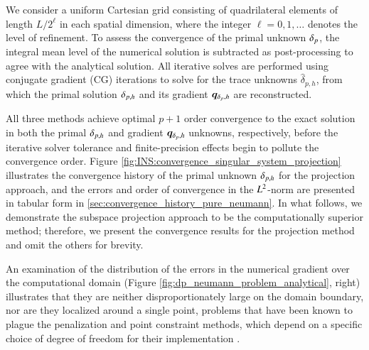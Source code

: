 We consider a uniform Cartesian grid consisting of quadrilateral elements of length $L/2^{\ell}$ in each spatial dimension, where the integer $\ell = 0, 1, \ldots$ denotes the level of refinement.
To assess the convergence of the primal unknown $\delta_{p}$, the integral mean level of the numerical solution is subtracted as post-processing to agree with the analytical solution.
All iterative solves are performed using conjugate gradient (CG) iterations to solve for the trace unknowns $\hat{\delta}_{p,h}$, from which the primal solution $\delta_{p,h}$ and its gradient $\bm{q}_{\delta_{p},h}$ are reconstructed.

All three methods achieve optimal $p+1$ order convergence to the exact solution in both the primal $\delta_{p,h}$ and gradient $\bm{q}_{\delta_{p},h}$ unknowns, respectively, before the iterative solver tolerance and finite-precision effects begin to pollute the convergence order. 
Figure \ref{fig:INS:convergence_singular_system_projection} illustrates the convergence history of the primal unknown $\delta_{p,h}$ for the projection approach, and the errors and order of convergence in the $L^2$-norm are presented in tabular form in \ref{sec:convergence_history_pure_neumann}.
In what follows, we demonstrate the subspace projection approach to be the computationally superior method; therefore, we present the convergence results for the projection method and omit the others for brevity. 

An examination of the distribution of the errors in the numerical gradient over the computational domain (Figure \ref{fig:dp_neumann_problem_analytical}, right) illustrates that they are neither disproportionately large on the domain boundary, nor are they localized around a single point, problems that have been known to plague the penalization and point constraint methods, which depend on a specific choice of degree of freedom for their implementation \cite{bochev_finite_2005,guermond_overview_2006}.

